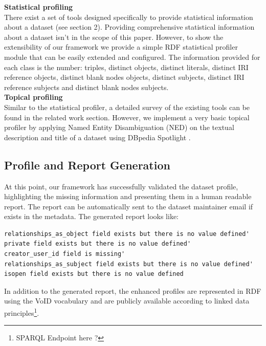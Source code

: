 \documentclass[runningheads,a4paper]{llncs}
\begin{document}
\textbf{Statistical profiling}\\

There exist a set of tools designed specifically to provide statistical information about a dataset (see section 2). Providing comprehensive statistical information about a dataset isn't in the scope of this paper. However, to show the extensibility of our framework we provide a simple RDF statistical profiler module that can be easily extended and configured. The information provided for each class is the number: triples, distinct objects, distinct literals, distinct IRI reference objects, distinct blank nodes objects, distinct subjects,
distinct IRI reference subjects and distinct blank nodes subjects.\\

\textbf{Topical profiling}\\

Similar to the statistical profiler, a detailed survey of the existing tools can be found in the related work section. However, we implement a very basic topical profiler by applying Named Entity Disambiguation (NED) on the textual description and title of a dataset using DBpedia Spotlight \cite{Mendes:2011:DSS:2063518.2063519}.

\subsection{Profile and Report Generation}

At this point, our framework has successfully validated the dataset profile, highlighting the missing information and presenting them in a human readable report. The report can be automatically sent to the dataset maintainer email if exists in the metadata. The generated report looks like:

\begin{lstlisting}
relationships_as_object field exists but there is no value defined'
private field exists but there is no value defined'
creator_user_id field is missing'
relationships_as_subject field exists but there is no value defined'
isopen field exists but there is no value defined
\end{lstlisting}

In addition to the generated report, the enhanced profiles are represented in RDF using the VoID vocabulary and are publicly available according to linked data principles\footnote{SPARQL Endpoint here ?}.


\nocite{*}

\end{document}
